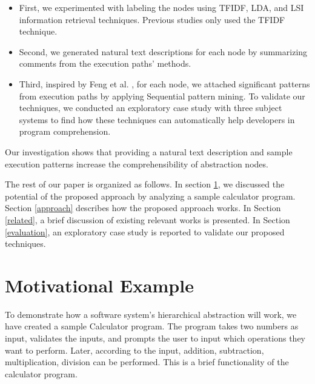 \begin{itemize}
    \item First, we experimented with labeling the nodes using TFIDF, LDA, and LSI information retrieval techniques. Previous studies only used the TFIDF technique.
    \item Second, we generated natural text descriptions for each node by summarizing comments from the execution paths' methods.
    \item Third, inspired by Feng et al. \cite{feng2018hierarchicalExecutionComprehension}, for each node, we attached significant patterns from execution paths by applying Sequential pattern mining. To validate our techniques, we conducted an exploratory case study with three subject systems to find how these techniques can automatically help developers in program comprehension. 
\end{itemize}

Our investigation shows that providing a natural text description and sample execution patterns increase the comprehensibility of abstraction nodes. 
  
The rest of our paper is organized as follows. In section \ref{motive}, we discussed the potential of the proposed approach by analyzing a sample calculator program. Section \ref{approach} describes how the proposed approach works. In Section \ref{related}, a brief discussion of existing relevant works is presented. In Section \ref{evaluation}, an exploratory case study is reported to validate our proposed techniques.

\section{Motivational Example}
\label{motive}
To demonstrate how a software system's hierarchical abstraction will work, we have created a sample Calculator program. The program takes two numbers as input, validates the inputs, and prompts the user to input which operations they want to perform. Later, according to the input, addition, subtraction, multiplication, division can be performed. This is a brief functionality of the calculator program. 


